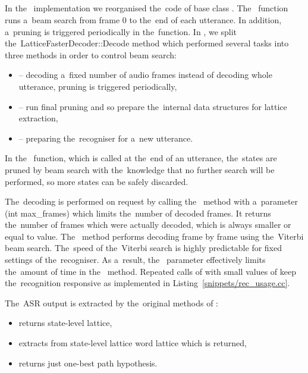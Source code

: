 \subsection{}
\label{sub:dec}
In the~ implementation we reorganised the~code of base class .
The~ function runs a~beam search from frame 0 to the~end of each utterance.
In addition, a~pruning is triggered periodically in the~function.
In ,  we split the~LatticeFasterDecoder::Decode method which performed several tasks into three methods in order to control beam search:
\begin{itemize}
    \item {} -- decoding a~fixed number of audio frames instead of decoding whole utterance, pruning is triggered periodically,
    \item {} -- run final pruning and so prepare the~internal data structures for lattice extraction,
    \item {} -- preparing the~recogniser for a~new utterance.
\end{itemize}

In the~ function, which is called at the~end of an utterance, the~states are pruned by beam search with the~knowledge that no further search will be performed, so more states can be safely discarded.

The~decoding is performed on request by calling the~ method with a~parameter (int max\_frames) which limits the~number of decoded frames.
It returns the~number of frames which were actually decoded, which is always smaller or equal to  value.
The~ method performs decoding frame by frame using the~Viterbi beam search.
The~speed of the~Viterbi search is highly predictable for fixed settings of the~recogniser. 
As a~result, the~ parameter effectively limits the~amount of time in the~ method.
Repeated calls of  with small values of  keep the~recognition responsive as implemented in Listing~\ref{snippets/rec_usage.cc}. 

The~\ac{ASR} output is extracted by the~original methods of :
\begin{itemize}
    \item {} returns state-level lattice,
    \item {} extracts from state-level lattice word lattice which is returned,
    \item {} returns just one-best path hypothesis.
\end{itemize}

